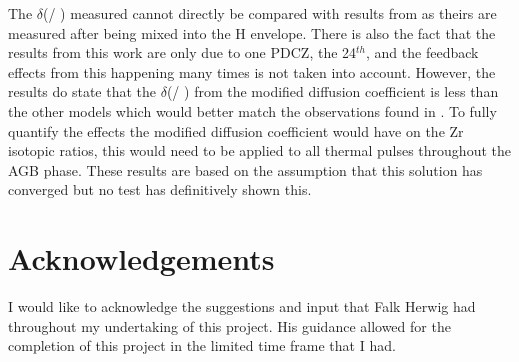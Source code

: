 \documentclass[fleqn,usenatbib]{mnras}
\begin{document}
The $\delta$(\zirconium[96] / \zirconium[94]) measured cannot directly be compared with results from \citep{zr} as theirs are measured after being mixed into the H envelope. There is also the fact that the results from this work are only due to one PDCZ, the 24$^{th}$, and the feedback effects from this happening many times is not taken into account. However, the results do state that the $\delta$(\zirconium[96] / \zirconium[94]) from the modified diffusion coefficient is less than the other models which would better match the observations found in \citep{grain}. To fully quantify the effects the modified diffusion coefficient would have on the Zr isotopic ratios, this would need to be applied to all thermal pulses throughout the AGB phase. These results are based on the assumption that this solution has converged but no test has definitively shown this.

 

\section*{Acknowledgements}

I would like to acknowledge the suggestions and input that Falk Herwig had throughout my undertaking of this project. His guidance allowed for the completion of this project in the limited time frame that I had.













\bsp	%
\label{lastpage}
\end{document}
